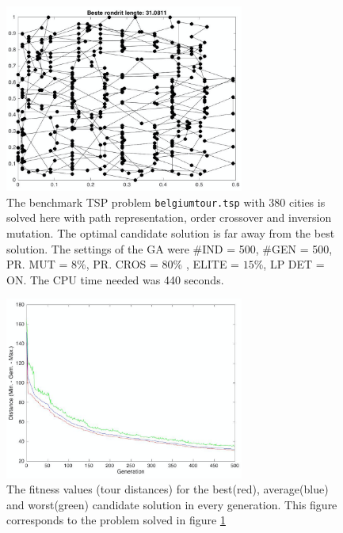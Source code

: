 \begin{figure}[!]
  \centering
    \includegraphics[width=0.7\textwidth]{../figures/figures_question_4/cities380_4_path}
      \caption{The benchmark TSP problem \texttt{belgiumtour.tsp} with 380 cities is solved here with path representation, order crossover and inversion mutation. The optimal candidate solution is far away from the best solution. The settings of the GA were \#IND = 500, \#GEN = 500, PR. MUT = $8\%$, PR. CROS = $80\%$ , ELITE = $15\%$, LP DET = ON. The CPU time needed was 440 seconds.}
      \label{fig:cities380_4_path}
\end{figure}

\begin{figure}[!]
  \centering
    \includegraphics[width=0.7\textwidth]{../figures/figures_question_4/cities380_4_gen}
      \caption{The fitness values (tour distances) for the best(red), average(blue) and worst(green) candidate solution in every generation. This figure corresponds to the problem solved in figure \ref{fig:cities380_4_path}}
      \label{fig:cities380_4_gen}
\end{figure}

